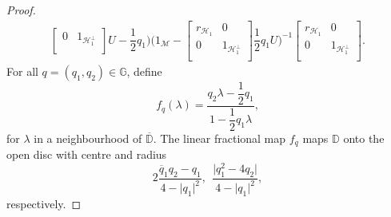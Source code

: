 \documentclass[12pt,reqno]{amsart}
\numberwithin{equation}{section}
\theoremstyle{definition}
\begin{document}
\begin{proof}
\begin{align*}
\begin{bmatrix}
	0 & 1_{\mathcal{H}_{1}^{\perp}} \\
\end{bmatrix}U-\dfrac{1}{2}q_{1}\bigg)\bigg(1_{\mathcal{M}}-
\begin{bmatrix}
	r_{\mathcal{H}_{1}} & 0 \\
	0 & 1_{\mathcal{H}_{1}^{\perp}} \\
\end{bmatrix}\dfrac{1}{2}q_{1}U\bigg)^{-1}\begin{bmatrix}
	r_{\mathcal{H}_{1}} & 0 \\
	0 & 1_{\mathcal{H}_{1}^{\perp}} \\
\end{bmatrix}.
\end{align*}
For all $q=(q_{1},q_{2})\in\mathbb{G}$, define 
$$f_{q}(\lambda) = \dfrac{q_{2}\lambda-\dfrac{1}{2}q_{1}}{1-\dfrac{1}{2}q_{1}\lambda},$$
for $\lambda$ in a neighbourhood of $\overline{\mathbb{D}}$. The linear fractional map $f_{q}$ maps $\mathbb{D}$ onto the open disc with centre and radius
$$ 2\dfrac{\overline{q}_{1}q_{2} -q_{1}}{4-\lvert{q_{1}\rvert}^{2}}, ~~\dfrac{\lvert{q_{1}^{2}-4q_{2}\rvert}}{4-\lvert{q_{1}\rvert}^{2}},$$
respectively. 


\end{proof}
\end{document}
